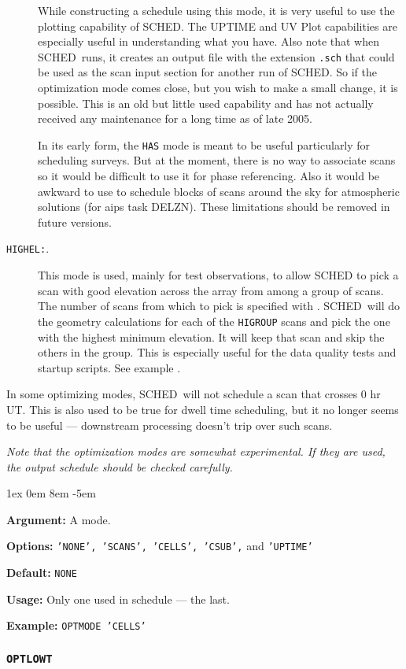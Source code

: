 \documentclass{report}
\newcommand{\sched}{{\sc SCHED}}
\newcommand{\schedb}{{\sc SCHED~}}
\newcommand{\rcwbox}[5]{
  \begin{list}{}{\parsep 1ex  \itemsep 0em
                 \leftmargin 8em  \itemindent -5em }
    \item {\bf Argument:} #1
    \item {\bf Options:}  #2
    \item {\bf Default:}  #3
    \item {\bf Usage:}    #4
    \item {\bf Example:}  #5
  \end{list}
}
\begin{document}
\begin{description}
While constructing a schedule using this mode, it is very useful to
use the plotting capability of \sched.  The UPTIME and UV Plot capabilities
are especially useful in understanding what you have.  Also note that
when \schedb runs, it creates an output file with the extension {\tt .sch}
that could be used as the scan input section for another run of \sched.
So if the optimization mode comes close, but you wish to make a small change,
it is possible.  This is an old but little used capability and has not
actually received any maintenance for a long time as of late 2005.


In its early form, the {\tt HAS} mode is meant to be useful particularly for
scheduling surveys.  But at the moment, there is no way to associate scans
so it would be difficult to use it for phase referencing.  Also it would
be awkward to use to schedule blocks of scans around the sky for atmospheric
solutions (for aips task DELZN).  These limitations should be removed
in future versions.

\item[{\tt HIGHEL:}.] This mode is used, mainly for test observations,
to allow SCHED to pick a scan with good elevation across the array from
among a group of scans.  The number of scans from which to pick is
specified with .  \schedb will do the 
geometry calculations for each of the {\tt HIGROUP} scans and pick the
one with the highest minimum elevation.  It will keep that scan and
skip the others in the group.  This is especially useful for the 
data quality tests and startup scripts.  See example 
.

\end{description}

In some optimizing modes, \schedb will not schedule a scan that crosses
0 hr UT.  This is also used to be true for dwell time scheduling, but it
no longer seems to be useful --- downstream processing doesn't trip over
such scans.

{\sl Note that the optimization modes are somewhat experimental.  If
they are used, the output schedule should be checked carefully.}

\rcwbox
{A mode.}
{{\tt 'NONE', 'SCANS', 'CELLS', 'CSUB',} and {\tt 'UPTIME'}}
{\tt NONE}
{Only one used in schedule --- the last.}
{{\tt OPTMODE 'CELLS'}}


\subsubsection{\label{MP:OPTLOWT}{\tt OPTLOWT}}
\end{document}
